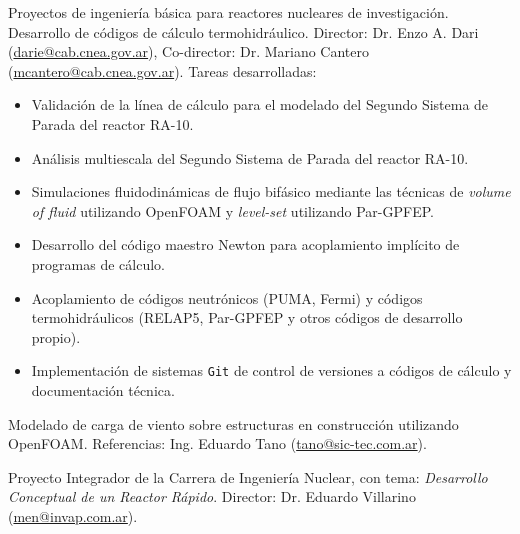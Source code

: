 \documentclass[11pt,a4paper,sans]{moderncv}        %
\begin{document}
{Proyectos de ingeniería básica para reactores nucleares de investigación.\newline{}%
Desarrollo de códigos de cálculo termohidráulico.\newline{}%
Director: Dr. Enzo A. Dari (\href{mailto:darie@cab.cnea.gov.ar}{darie@cab.cnea.gov.ar}), Co-director: Dr. Mariano Cantero (\href{mailto:mcantero@cab.cnea.gov.ar}{mcantero@cab.cnea.gov.ar}).\newline{}%
Tareas desarrolladas:%
\begin{itemize}%
\item Validación de la línea de cálculo para el modelado del Segundo Sistema de Parada del reactor RA-10.
\item Análisis multiescala del Segundo Sistema de Parada del reactor RA-10.
\item Simulaciones fluidodinámicas de flujo bifásico mediante las técnicas de \textit{volume of fluid} utilizando OpenFOAM y \textit{level-set} utilizando Par-GPFEP.
\item Desarrollo del código maestro Newton para acoplamiento implícito de programas de cálculo.
\item Acoplamiento de códigos neutrónicos (PUMA, Fermi) y códigos termohidráulicos (RELAP5, Par-GPFEP y otros códigos de desarrollo propio).
\item Implementación de sistemas \texttt{Git} de control de versiones a códigos de cálculo y documentación técnica.
\end{itemize}}


{Modelado de carga de viento sobre estructuras en construcción utilizando OpenFOAM.\newline{}
Referencias: Ing. Eduardo Tano (\href{mailto:tano@sic-tec.com.ar}{tano@sic-tec.com.ar}).}

{Proyecto Integrador de la Carrera de Ingeniería Nuclear, con tema: \textit{Desarrollo Conceptual de un Reactor Rápido}.\newline{}
Director: Dr. Eduardo Villarino (\href{mailto:men@invap.com.ar}{men@invap.com.ar}).}
\end{document}
